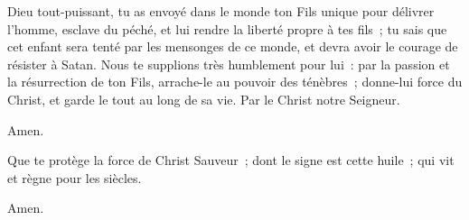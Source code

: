 
Dieu tout-puissant, tu as envoyé dans le monde ton Fils
unique pour délivrer l'homme, esclave du péché, et lui
rendre la liberté propre à tes fils~; tu sais que cet
enfant sera tenté par les mensonges de ce monde, et devra
avoir le courage de résister à Satan. Nous te supplions
très humblement pour lui~: par la passion et la résurrection
de ton Fils, arrache-le au pouvoir des ténèbres~; donne-lui
force du Christ, et garde le tout au long de sa vie.
Par le Christ notre Seigneur.

 Amen.


Que te protège la force de Christ Sauveur~; dont le signe est cette huile~;
qui vit et règne pour les siècles.

 Amen.

